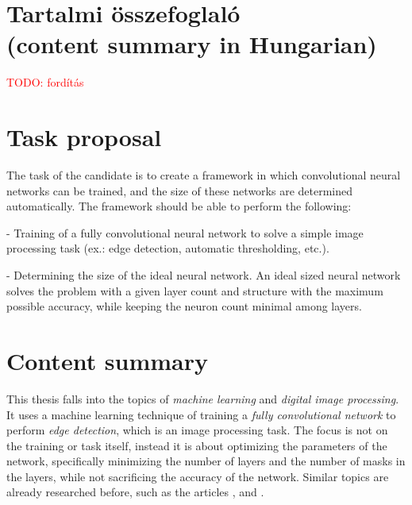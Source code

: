 \documentclass[12pt]{report}
\newcommand\todo[1]{\textcolor{red}{#1}}
\begin{document}
\begingroup
	\hypersetup{hidelinks}
	\tableofcontents
\endgroup


\chapter*{Tartalmi összefoglaló\\(content summary in Hungarian)}

\todo{TODO: fordítás}

\chapter*{Task proposal}

The task of the candidate is to create a framework in which convolutional neural networks can be trained, and the size of these networks are determined automatically. The framework should be able to perform the following:\par

- Training of a fully convolutional neural network to solve a simple image processing task (ex.: edge detection, automatic thresholding, etc.).\par

- Determining the size of the ideal neural network. An ideal sized neural network solves the problem with a given layer count and structure with the maximum possible accuracy, while keeping the neuron count minimal among layers.

\chapter*{Content summary}

This thesis falls into the topics of \textit{machine learning} and \textit{digital image processing}. It uses a machine learning technique of training a \textit{fully convolutional network} to perform \textit{edge detection}, which is an image processing task. The focus is not on the training or task itself, instead it is about optimizing the parameters of the network, specifically minimizing the number of layers and the number of masks in the layers, while not sacrificing the accuracy of the network. Similar topics are already researched before, such as the articles \cite{pruning_web}, \cite{pruning_arxiv} and \cite{understanding}.
\par
\end{document}
